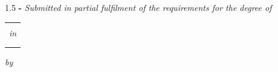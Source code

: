 \addtocounter{page}{-1}
\thispagestyle{empty}
\centering 
\begin{spacing}{1.5}
\vspace{0.5em}
\LARGE{\textbf{\coursecode - \coursename}} 
\vspace{1em} \linebreak
\Large{\textbf{\MakeUppercase{\thesistitle}}} 
\vspace{1em} \linebreak
\large{\textit{Submitted in partial fulfilment of the requirements for the degree of}} 
\vspace{2em} \linebreak
\begin{tabular}[!h]{c}
	\LARGE{\textbf{\programdegree}} \\ [0.5ex]
		\textit{in}  \\ [0.5ex]
	\LARGE{\textbf{\programname}} \\ [0.5ex]
	\LARGE{\textbf{\specialization}} \\ [0.5ex]
\end{tabular}
\vspace{0.5em} \linebreak
\textit{by}  
\vspace{0.5em} \linebreak
\end{spacing}
